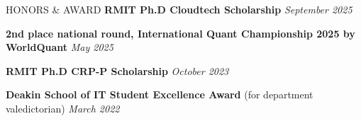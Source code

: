 \documentclass{resume}
\begin{document}
\begin{rSection}{HONORS \& AWARD}
\textbf{RMIT Ph.D Cloudtech Scholarship} \hfill {\em September 2025}
\vspace{-5pt}

\textbf{2nd place national round, International Quant Championship 2025 by WorldQuant} \hfill {\em May 2025}
\vspace{-5pt}

\textbf{RMIT Ph.D CRP-P Scholarship} \hfill {\em October 2023}
\vspace{-5pt}




\textbf{Deakin School of IT Student Excellence Award} (for department valedictorian) \hfill {\em March 2022}
\vspace{-5pt}


\end{rSection}

\end{document}
